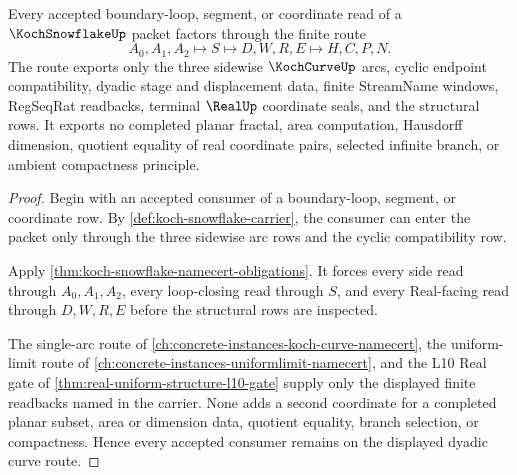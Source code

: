 \begin{theorem}
\label{thm:koch-snowflake-dyadic-curve-route}
Every accepted boundary-loop, segment, or coordinate read of a $\KochSnowflakeUp$ packet factors through the finite route
$$
A_0,A_1,A_2 \longmapsto S \longmapsto D,W,R,E \longmapsto H,C,P,N .
$$
The route exports only the three sidewise $\KochCurveUp$ arcs, cyclic endpoint compatibility, dyadic stage and displacement data, finite StreamName windows, RegSeqRat readbacks, terminal $\RealUp$ coordinate seals, and the structural rows. It exports no completed planar fractal, area computation, Hausdorff dimension, quotient equality of real coordinate pairs, selected infinite branch, or ambient compactness principle.
\end{theorem}
\begin{proof}
Begin with an accepted consumer of a boundary-loop, segment, or coordinate row. By \autoref{def:koch-snowflake-carrier}, the consumer can enter the packet only through the three sidewise arc rows and the cyclic compatibility row.

Apply \autoref{thm:koch-snowflake-namecert-obligations}. It forces every side read through $A_0,A_1,A_2$, every loop-closing read through $S$, and every Real-facing read through $D,W,R,E$ before the structural rows are inspected.

The single-arc route of \autoref{ch:concrete-instances-koch-curve-namecert}, the uniform-limit route of \autoref{ch:concrete-instances-uniformlimit-namecert}, and the L10 Real gate of \autoref{thm:real-uniform-structure-l10-gate} supply only the displayed finite readbacks named in the carrier. None adds a second coordinate for a completed planar subset, area or dimension data, quotient equality, branch selection, or compactness. Hence every accepted consumer remains on the displayed dyadic curve route.
\end{proof}



